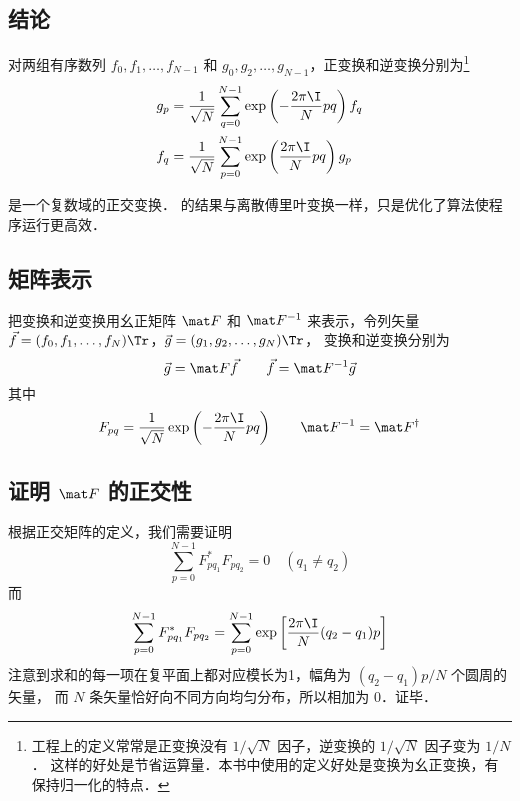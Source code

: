 
\subsection{结论}

对两组有序数列 $f_0,f_1,\dots,f_{N-1}$ 和 $g_0,g_2,\dots,g_{N-1}$，正变换和逆变换分别为\footnote{工程上的定义常常是正变换没有 $1/\sqrt{N}$ 因子，逆变换的 $1/\sqrt{N}$ 因子变为 $1/N$． 这样的好处是节省运算量．本书中使用的定义好处是变换为幺正变换，有保持归一化的特点．}
\begin{align}
g_p &= \frac{1}{\sqrt{N}}\sum\limits_{q=0}^{N-1} \exp\left(-\frac{2\pi\I}{N} p q \right) f_q \\
f_q &= \frac{1}{\sqrt{N}}\sum\limits_{p=0}^{N-1} \exp\left(\frac{2\pi\I}{N} p q\right) g_p
\end{align}

是一个复数域的正交变换．%
的结果与离散傅里叶变换一样，只是优化了算法使程序运行更高效．

\subsection{矩阵表示}
把变换和逆变换用幺正矩阵 $\mat F$ 和 $\mat F^{-1}$ 来表示，令列矢量 $\vec f = (f_0,f_1,\dots,f_N)\Tr$，$\vec g = (g_1,g_2,\dots,g_N)\Tr$， 变换和逆变换分别为
\begin{equation}
\vec g = \mat F \vec f \qquad
\vec f = \mat F^{-1} \vec g
\end{equation}
其中
\begin{equation}
F_{pq} = \frac{1}{\sqrt{N}} \exp\left(-\frac{2\pi\I}{N} p q \right) \qquad
\mat F^{-1} = \mat F^\dag
\end{equation}

\subsection{证明 $\mat F$ 的正交性}
根据正交矩阵的定义，我们需要证明
\begin{equation}
\sum\limits_{p=0}^{N-1} F^*_{pq_1}F_{pq_2} = 0 \quad (q_1 \ne q_2)
\end{equation}
而
\begin{equation}\label{DFT_eq1}
\sum\limits_{p=0}^{N-1} F^*_{pq_1}F_{pq_2}
= \sum\limits_{p=0}^{N-1} \exp\left[\frac{2\pi\I}{N} (q_2-q_1) p \right]
\end{equation}
注意到求和的每一项在复平面上都对应模长为1，幅角为 $(q_2-q_1)p/N$ 个圆周的矢量，%
而 $N$ 条矢量恰好向不同方向均匀分布，所以相加为 $0$．证毕．

